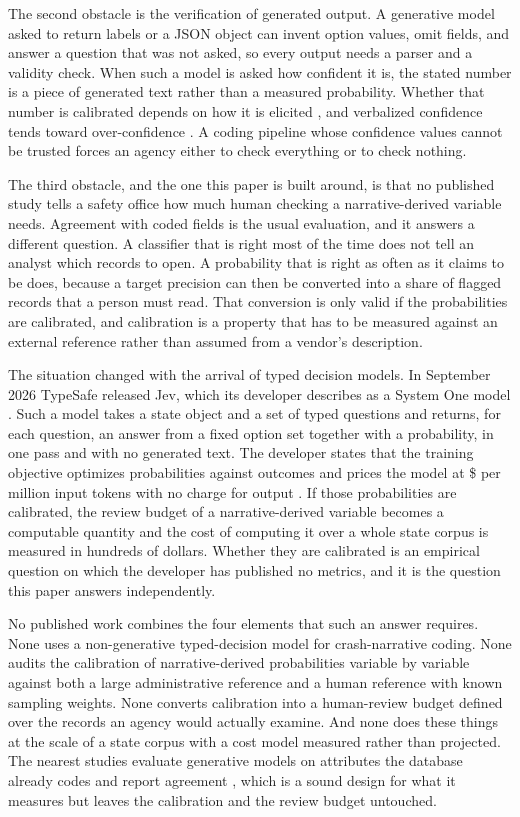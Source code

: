 The second obstacle is the verification of generated output. A generative model asked to
return labels or a JSON object can invent option values, omit fields, and answer a question that was not asked, so
every output needs a parser and a validity check. When such a model is asked how confident it is, the stated number is a piece of generated text rather than a measured probability. Whether that number is calibrated depends on how it is elicited \citep{kadavath2022know,tian2023just}, and verbalized confidence tends toward over-confidence \citep{xiong2024express}. A
coding pipeline whose confidence values cannot be trusted forces an agency either to check
everything or to check nothing.

The third obstacle, and the one this paper is built around, is that no published study tells
a safety office how much human checking a narrative-derived variable needs. Agreement with
coded fields is the usual evaluation, and it answers a different question. A classifier that
is right most of the time does not tell an analyst which records to open. A probability that
is right as often as it claims to be does, because a target precision can then be converted
into a share of flagged records that a person must read. That conversion is only
valid if the probabilities are calibrated, and calibration is a property that has to be
measured against an external reference rather than assumed from a vendor's description.

The situation changed with the arrival of typed decision models. In September 2026 TypeSafe
released Jev, which its developer describes as a System One model
\citep{typesafe2026launch,typesafe2026systemone}. Such a model takes a state object and a set
of typed questions and returns, for each question, an answer from a fixed option set together
with a probability, in one pass and with no generated text. The developer states that the training
objective optimizes probabilities against outcomes and prices the model at
\$\JevPricePerM{} per million input tokens with no charge for output
\citep{typesafe2026models}. If those probabilities are calibrated, the review budget of a
narrative-derived variable becomes a computable quantity and the cost of computing it over a whole state corpus is measured in hundreds of dollars. Whether they are calibrated is an
empirical question on which the developer has published no metrics, and it is the question
this paper answers independently.

No published work combines the four elements that such an answer requires. None uses a
non-generative typed-decision model for crash-narrative coding. None audits the calibration
of narrative-derived probabilities variable by variable against both a large administrative
reference and a human reference with known sampling weights. None converts calibration into
a human-review budget defined over the records an agency would actually examine. And none
does these things at the scale of a state corpus with a cost model measured rather than
projected. The nearest studies evaluate generative models on attributes the database already
codes and report agreement \citep{bharati2026benchmarking,zhang2025secondary}, which is a
sound design for what it measures but leaves the calibration and the review budget
untouched.

